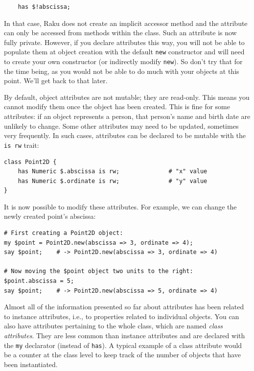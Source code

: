 \begin{verbatim}
    has $!abscissa;  
\end{verbatim}
%
In that case, Raku does not create an implicit accessor method 
and the attribute can only be accessed from methods within 
the class. Such an attribute is now fully private. 
However, if you declare attributes this way, you 
will not be able to populate them at object creation with 
the default {\tt new} constructor and will need to create your 
own constructor (or indirectly modify {\tt new}). So don't try 
that for the time being, as you would not be able to do much 
with your objects at this point. We'll get back to that later.

By default, object attributes are not mutable; they are read-only. 
This means you cannot modify them once the object has been created. 
This is fine for some attributes: if an object represents a 
person, that person's name and birth date are unlikely to 
change. Some other attributes may need to be updated, sometimes 
very frequently. In such cases, attributes can be declared 
to be mutable with the {\tt is rw} trait:

\begin{verbatim}
class Point2D {
    has Numeric $.abscissa is rw;              # "x" value
    has Numeric $.ordinate is rw;              # "y" value
}
\end{verbatim}
%
It is now possible to modify these attributes. For example, 
we can change the newly created point's abscissa:

\begin{verbatim}
# First creating a Point2D object:
my $point = Point2D.new(abscissa => 3, ordinate => 4);
say $point;    # -> Point2D.new(abscissa => 3, ordinate => 4)

# Now moving the $point object two units to the right:
$point.abscissa = 5; 
say $point;    # -> Point2D.new(abscissa => 5, ordinate => 4)
\end{verbatim}


Almost all of the information presented so far about attributes 
has been related to instance attributes, i.e., to properties related to 
individual objects. You can also have attributes pertaining 
to the whole class, which are named \emph{class attributes}. 
They are less common than instance attributes and are declared 
with the {\tt my} declarator (instead of {\tt has}). A typical 
example of a class attribute would be a counter at the class level 
to keep track of the number of objects that have been 
instantiated. 


